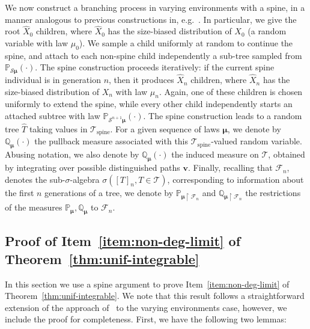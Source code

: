 \documentclass[12pt]{article}
\theoremstyle{definition}
\newcommand{\Prob}[2][]{\ensuremath{\mathbb{P}_{#1} \left(#2 \right)}}
\newcommand{\Probtwo}[2][]{\ensuremath{\mathbb{Q}_{#1} \left(#2 \right)}}
\DeclareMathOperator{\spine}{spine}
\begin{document}
We now construct a branching process in varying environments with a spine, in a manner analogous to previous constructions in, e.g.~\cite{yaglom-limit-law}. In particular, we give the root $\widehat{X}_0$ children, where $\widehat{X}_0$ has the size-biased distribution of $X_0$ (a random variable with law $\mu_0$). We sample a child uniformly at random to continue the spine, and attach to each non-spine child independently a sub-tree sampled from $\Prob[\mathcal{S}\boldsymbol{\mu}]{\cdot}$. The spine construction proceeds iteratively: if the current spine individual is in generation $n$, then it produces $\widehat{X}_n$ children, where $\widehat{X}_n$ has the size-biased distribution of $X_n$ with law $\mu_n$. Again, one of these children is chosen uniformly to extend the spine, while every other child independently starts an attached subtree with law $\Prob[\mathcal{S}^{n+1}\boldsymbol{\mu}]{\cdot}$. The spine construction leads to a random tree $\widehat{T}$ taking values in $\mathscr{T}_{\spine}$. For a given sequence of laws $\boldsymbol{\mu}$, we denote by $\Probtwo[\boldsymbol{\mu}]{\cdot}$ the pullback measure associated with this $\mathscr{T}_{\spine}$-valued random variable. Abusing notation, we also denote by $\Probtwo[\boldsymbol{\mu}]{\cdot}$ the induced measure on $\mathscr{T}$, obtained by integrating over possible distinguished paths $\boldsymbol{v}$. Finally, recalling that $\mathscr{F}_{n}$, denotes the sub-$\sigma$-algebra $\sigma([T]_{n}, T \in \mathscr{T})$,  corresponding to information about the first $n$ generations of a tree, we denote by $\mathbb{P}_{\boldsymbol{\mu} \restriction \mathscr{F}_n}$ and $\mathbb{Q}_{\boldsymbol{\mu} \restriction \mathscr{F}_n}$ the restrictions of the measures $\mathbb{P}_{\boldsymbol{\mu}}, \mathbb{Q}_{\boldsymbol{\mu}}$ to $\mathscr{F}_{n}$. 

\subsection{Proof of Item~\ref{item:non-deg-limit} of Theorem~\ref{thm:unif-integrable}}
In this section we use a spine argument to prove Item~\ref{item:non-deg-limit} of Theorem~\ref{thm:unif-integrable}. We note that this result follows a straightforward extension of the approach of~\cite{conceptual-xlogx} to the varying environments case, however, we include the proof for completeness. First, we have the following two lemmas:
\end{document}
